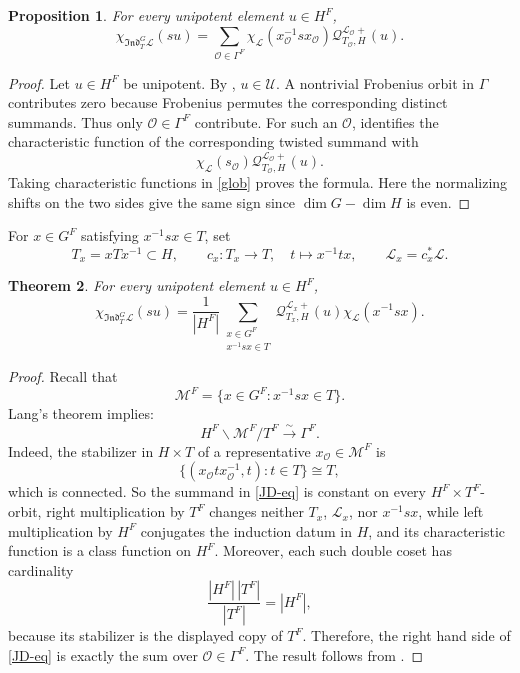 \documentclass[11pt,letterpaper]{amsart}
\newtheorem{theorem}{Theorem}
\newtheorem{proposition}[theorem]{Proposition}
\theoremstyle{definition}
\numberwithin{equation}{section}
\numberwithin{theorem}{section}
\begin{document}
\begin{proposition}\label{Jsum}
For every unipotent element \(u\in H^F\),
\[\chi_{\mathfrak{Ind}^{G}_{T}\mathcal L}(su)
 =
  \sum_{\mathcal O\in\Gamma^F}
  \chi_{\mathcal L}(x_{\mathcal O}^{-1}sx_{\mathcal O})
  \mathcal{Q}_{T_{\mathcal O},H}^{\mathcal L_{\mathcal O}+}(u).\]
\end{proposition}
\begin{proof}
Let \(u\in H^F\) be unipotent. By
, \(u\in\mathcal U\). A nontrivial
Frobenius orbit in \(\Gamma\) contributes zero because Frobenius
permutes the corresponding distinct summands. Thus only
\(\mathcal O\in\Gamma^F\) contribute. For such an \(\mathcal O\),
 identifies the characteristic function of the corresponding
twisted summand with
\[
 \chi_{\mathcal L}(s_{\mathcal O})
 \mathcal{Q}_{T_{\mathcal O},H}^{\mathcal L_{\mathcal O}+}(u).
\]
Taking characteristic functions in \eqref{glob} proves the
formula. Here the
normalizing shifts on the two sides give the same sign since
$\dim G-\dim H$ is even.
\end{proof}






For \(x\in G^F\) satisfying \(x^{-1}sx\in T\), set
\[
 T_x=xTx^{-1}\subset H,
 \qquad
 c_x:T_x\longrightarrow T,\quad t\longmapsto x^{-1}tx,
 \qquad
 \mathcal L_x=c_x^*\mathcal L.
\]
\begin{theorem}
\label{JD}
For every unipotent element \(u\in H^F\),
\begin{equation}
\chi_{\mathfrak{Ind}^{G}_T\mathcal{L}}(su)
 =\frac{1}{|H^F|}
 \sum_{\substack{x\in G^F\\x^{-1}sx\in T}}
 \mathcal{Q}_{T_x,H}^{\mathcal L_x+}(u)
 \chi_\mathcal{L}(x^{-1}sx).
\label{JD-eq}
\end{equation}
\end{theorem}
\begin{proof}
Recall that
\[
\mathcal M^F=\{x\in G^F:x^{-1}sx\in T\}.
\]
Lang's theorem implies:
\[
 H^F\backslash\mathcal M^F/T^F\xrightarrow{\sim}\Gamma^F.
\]
Indeed, the stabilizer in \(H\times T\) of a representative
\(x_{\mathcal O}\in\mathcal M^F\) is
\[
 \{(x_{\mathcal O}tx_{\mathcal O}^{-1},t):t\in T\}\cong T,
\]
which is connected. So the summand in \eqref{JD-eq} is constant on every
\(H^F\times T^F\)-orbit, right multiplication by \(T^F\) changes
neither \(T_x\), \(\mathcal L_x\), nor \(x^{-1}sx\), while left
multiplication by \(H^F\) conjugates the induction datum in \(H\),
and its characteristic function is a class function on \(H^F\). Moreover,
each such double coset has cardinality
\[
 \frac{|H^F|\,|T^F|}{|T^F|}=|H^F|,
\]
because its stabilizer is the displayed copy of \(T^F\). Therefore, the
right hand side of \eqref{JD-eq} is exactly the sum over
\(\mathcal O\in\Gamma^F\). The result follows from
.
\end{proof}
\end{document}
